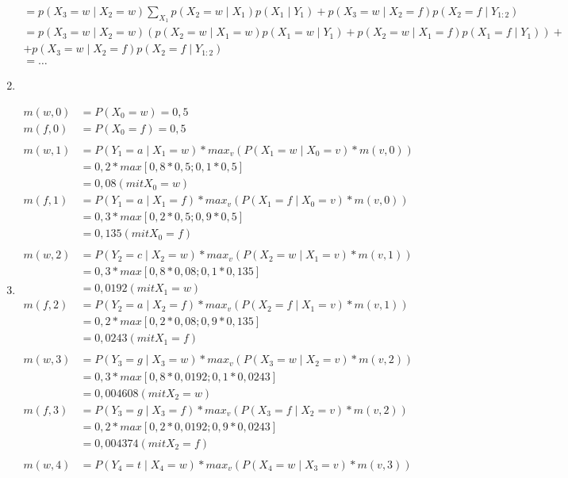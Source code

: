 \documentclass[a4paper,10pt]{article}
\begin{document}
\begin{enumerate}[~~(a)]
\begin{align*}
        = p(X_3 = w \mid X_2 = w)\sum_{X_1}p(X_2 = w \mid X_1)p(X_1 \mid Y_1) + p(X_3 = w \mid X_2 = f)p(X_2 = f \mid Y_{1:2}) \\
        = p(X_3 = w \mid X_2 = w)(p(X_2 = w \mid X_1 = w)p(X_1 = w \mid Y_1) + p(X_2 = w \mid X_1 = f)p(X_1 = f \mid Y_1)) + \\ + p(X_3 = w \mid X_2 = f)p(X_2 = f \mid Y_{1:2}) \\
        = \dots
        \end{align*}
    \item
    \item
	\begin{align*}
		m(w,0) &= P(X_0 = w) = 0,5 \\
		m(f,0) &= P(X_0 = f) = 0,5\\ \\
		m(w,1) &= P(Y_1 = a \mid X_1 = w) * max_v (P(X_1 = w \mid X_0 = v) * m(v,0)) \\
		&= 0,2 * max[0,8*0,5;0,1*0,5]\\
		&= 0,08  (mit X_0 = w)\\
		m(f,1) &= P(Y_1 = a \mid X_1 = f) * max_v (P(X_1 = f \mid X_0 = v) * m(v,0)) \\
		&= 0,3 * max[0,2*0,5;0,9*0,5]\\
		&= 0,135  (mit X_0 = f)\\ \\
		m(w,2) &= P(Y_2 = c \mid X_2 = w) * max_v (P(X_2 = w \mid X_1 = v) * m(v,1)) \\
		&= 0,3 * max[0,8*0,08;0,1*0,135]\\
		&= 0,0192  (mit X_1 = w)\\
		m(f,2) &= P(Y_2 = a \mid X_2 = f) * max_v (P(X_2 = f \mid X_1 = v) * m(v,1)) \\
		&= 0,2 * max[0,2*0,08;0,9*0,135]\\
		&= 0,0243  (mit X_1 = f)\\ \\
		m(w,3) &= P(Y_3 = g \mid X_3 = w) * max_v (P(X_3 = w \mid X_2 = v) * m(v,2)) \\
		&= 0,3 * max[0,8*0,0192;0,1*0,0243]\\
		&= 0,004608  (mit X_2 = w)\\
		m(f,3) &= P(Y_3 = g \mid X_3 = f) * max_v (P(X_3 = f \mid X_2 = v) * m(v,2)) \\
		&= 0,2 * max[0,2*0,0192;0,9*0,0243]\\
		&= 0,004374  (mit X_2 = f)\\ \\
		m(w,4) &= P(Y_4 = t \mid X_4 = w) * max_v (P(X_4 = w \mid X_3 = v) * m(v,3)) \\

\end{align*}
\end{enumerate}
\end{document}
